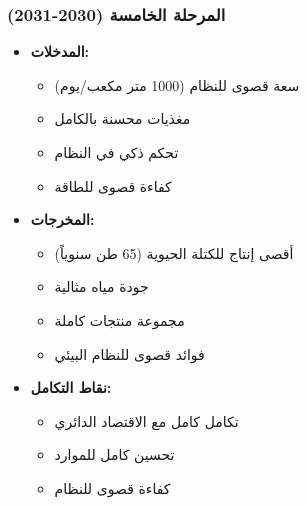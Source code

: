 \subsubsection{المرحلة الخامسة (2030-2031)}
\begin{itemize}
    \item \textbf{المدخلات:}
    \begin{itemize}
        \item سعة قصوى للنظام (1000 متر مكعب/يوم)
        \item مغذيات محسنة بالكامل
        \item تحكم ذكي في النظام
        \item كفاءة قصوى للطاقة
    \end{itemize}
    \item \textbf{المخرجات:}
    \begin{itemize}
        \item أقصى إنتاج للكتلة الحيوية (65 طن سنوياً)
        \item جودة مياه مثالية
        \item مجموعة منتجات كاملة
        \item فوائد قصوى للنظام البيئي
    \end{itemize}
    \item \textbf{نقاط التكامل:}
    \begin{itemize}
        \item تكامل كامل مع الاقتصاد الدائري
        \item تحسين كامل للموارد
        \item كفاءة قصوى للنظام
    \end{itemize}
\end{itemize}
